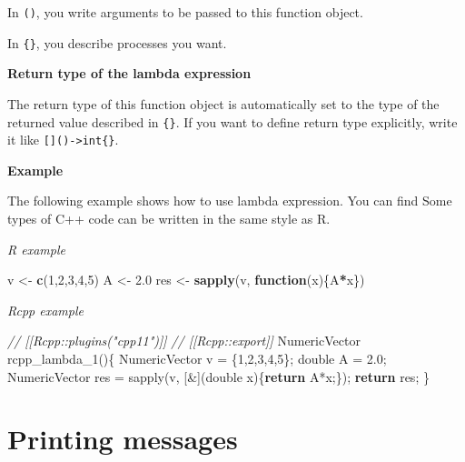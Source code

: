 \documentclass[]{book}
\newenvironment{Shaded}{\begin{snugshade}}{\end{snugshade}}
\newcommand{\KeywordTok}[1]{\textcolor[rgb]{0.13,0.29,0.53}{\textbf{#1}}}
\newcommand{\DataTypeTok}[1]{\textcolor[rgb]{0.13,0.29,0.53}{#1}}
\newcommand{\DecValTok}[1]{\textcolor[rgb]{0.00,0.00,0.81}{#1}}
\newcommand{\FloatTok}[1]{\textcolor[rgb]{0.00,0.00,0.81}{#1}}
\newcommand{\StringTok}[1]{\textcolor[rgb]{0.31,0.60,0.02}{#1}}
\newcommand{\CommentTok}[1]{\textcolor[rgb]{0.56,0.35,0.01}{\textit{#1}}}
\newcommand{\ControlFlowTok}[1]{\textcolor[rgb]{0.13,0.29,0.53}{\textbf{#1}}}
\newcommand{\OperatorTok}[1]{\textcolor[rgb]{0.81,0.36,0.00}{\textbf{#1}}}
\newcommand{\NormalTok}[1]{#1}
\theoremstyle{definition}
\theoremstyle{definition}
\theoremstyle{remark}
\begin{document}
In \texttt{()}, you write arguments to be passed to this function
object.

In \texttt{\{\}}, you describe processes you want.

\textbf{Return type of the lambda expression}

The return type of this function object is automatically set to the type
of the returned value described in \texttt{\{\}}. If you want to define
return type explicitly, write it like
\texttt{{[}{]}()-\textgreater{}int\{\}}.

\textbf{Example}

The following example shows how to use lambda expression. You can find
Some types of C++ code can be written in the same style as R.

\emph{R example}

\begin{Shaded}
\begin{Highlighting}[]
\NormalTok{v <-}\StringTok{ }\KeywordTok{c}\NormalTok{(}\DecValTok{1}\NormalTok{,}\DecValTok{2}\NormalTok{,}\DecValTok{3}\NormalTok{,}\DecValTok{4}\NormalTok{,}\DecValTok{5}\NormalTok{)}
\NormalTok{A <-}\StringTok{ }\FloatTok{2.0}
\NormalTok{res <-}
\StringTok{  }\KeywordTok{sapply}\NormalTok{(v, }\ControlFlowTok{function}\NormalTok{(x)\{A}\OperatorTok{*}\NormalTok{x\})}
\end{Highlighting}
\end{Shaded}

\emph{Rcpp example}

\begin{Shaded}
\begin{Highlighting}[]
\CommentTok{// [[Rcpp::plugins("cpp11")]]}
\CommentTok{// [[Rcpp::export]]}
\NormalTok{NumericVector rcpp_lambda_1()\{}
\NormalTok{  NumericVector v = \{}\DecValTok{1}\NormalTok{,}\DecValTok{2}\NormalTok{,}\DecValTok{3}\NormalTok{,}\DecValTok{4}\NormalTok{,}\DecValTok{5}\NormalTok{\};}
  \DataTypeTok{double}\NormalTok{ A = }\FloatTok{2.0}\NormalTok{;}
\NormalTok{  NumericVector res =}
\NormalTok{    sapply(v, [&](}\DataTypeTok{double}\NormalTok{ x)\{}\ControlFlowTok{return}\NormalTok{ A*x;\});}
  \ControlFlowTok{return}\NormalTok{ res;}
\NormalTok{\}}
\end{Highlighting}
\end{Shaded}

\chapter{Printing messages}\label{printing-messages}
\end{document}
